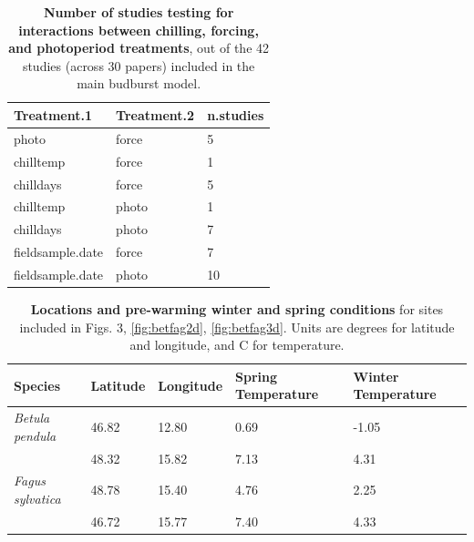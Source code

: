 \documentclass{article}
\begin{document}
\begin{footnotesize}
\begin{table}[ht]
\centering
\caption{\textbf{Number of studies testing for interactions between chilling, forcing, and photoperiod treatments}, out of the 42 studies (across 30 papers) included in the main budburst model.} 
\label{tab:intxn}
\begingroup\footnotesize
\begin{tabular}{|p{}|p{}|p{}|}
  \hline
Treatment.1 & Treatment.2 & n.studies \\ 
  \hline
photo & force &   5 \\ 
  chilltemp & force &   1 \\ 
  chilldays & force &   5 \\ 
  chilltemp & photo &   1 \\ 
  chilldays & photo &   7 \\ 
  fieldsample.date & force &   7 \\ 
  fieldsample.date & photo &  10 \\ 
   \hline
\end{tabular}
\endgroup
\end{table}
\begin{table}[ht]
\centering
\caption{\textbf{Locations and pre-warming winter and spring conditions} for sites included in Figs. 3, \ref{fig:betfag2d}, \ref{fig:betfag3d}. Units are degrees for latitude and longitude, and \degree C for temperature. } 
\label{tab:clim}
\begingroup\footnotesize
\begin{tabular}{|p{}|p{}|p{}|p{}|p{}|}
  \hline
Species & Latitude & Longitude & Spring Temperature & Winter Temperature \\ 
  \hline
\textit{Betula pendula} & 46.82 & 12.80 & 0.69 & -1.05 \\ 
  \textit{} & 48.32 & 15.82 & 7.13 & 4.31 \\ 
  \textit{Fagus sylvatica} & 48.78 & 15.40 & 4.76 & 2.25 \\ 
  \textit{} & 46.72 & 15.77 & 7.40 & 4.33 \\ 
   \hline
\end{tabular}
\endgroup
\end{table}



\end{footnotesize}
\end{document}
